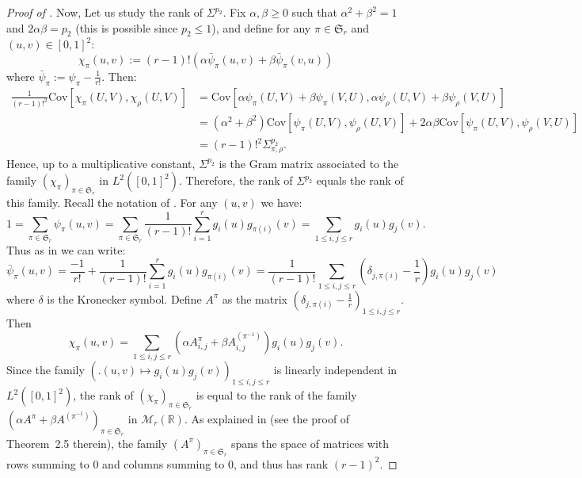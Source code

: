 \documentclass{article}
\theoremstyle{remark}
\def\R{\mathbb{R}}
\newcommand{\cov}[2]{\mathrm{Cov}\left[#1,#2\right]}
\def\S{\mathfrak{S}}
\def\carre{[0,1]^2}
\begin{document}
\begin{proof}[Proof of ]
    Now, Let us study the rank of $\Sigma^{p_2}$.
    Fix $\alpha,\beta \ge 0$ such that $\alpha^2+\beta^2=1$ and $2\alpha\beta=p_2$ (this is possible since $p_2\le 1$), and define for any $\pi\in\S_r$ and $(u,v)\in\carre$: 
    \begin{equation*}
        \chi_\pi(u,v) := (r-1)!\left(\alpha\bar\psi_\pi(u,v) + \beta\bar\psi_\pi(v,u)\right)
    \end{equation*}
    where $\bar\psi_\pi := \psi_\pi - \frac{1}{r!}$.
    Then:
    \begin{align*}
        \frac{1}{(r-1)!^2}\cov{\chi_\pi(U,V)}{\chi_\rho(U,V)}
        &= \cov{\alpha\psi_\pi(U,V) + \beta\psi_\pi(V,U)}{\alpha\psi_\rho(U,V) + \beta\psi_\rho(V,U)}
        \\&= (\alpha^2+\beta^2)\cov{\psi_\pi(U,V)}{\psi_\rho(U,V)}
        + 2\alpha\beta\cov{\psi_\pi(U,V)}{\psi_\rho(V,U)}
        \\&= (r-1)!^2\Sigma^{p_2}_{\pi,\rho} .
    \end{align*}
    Hence, up to a multiplicative constant, $\Sigma^{p_2}$ is the Gram matrix associated to the family $(\chi_\pi)_{\pi\in\S_r}$ in $L^2(\carre)$.
    Therefore, the rank of $\Sigma^{p_2}$ equals the rank of this family.
    Recall the notation of .
    For any $(u,v)$ we have:
    \begin{equation*}
        1 = \sum_{\pi\in\S_r} \psi_\pi(u,v)
        = \sum_{\pi\in\S_r}\frac{1}{(r-1)!}\sum_{i=1}^r g_i(u) g_{\pi(i)}(v)
        = \sum_{1\le i,j\le r} g_i(u) g_j(v) .
    \end{equation*}
    Thus as in \cite{JNZ15} we can write:
    \begin{equation*}
        \bar\psi_\pi(u,v)
        = \frac{-1}{r!} + \frac{1}{(r-1)!}\sum_{i=1}^r g_i(u) g_{\pi(i)}(v)
        = \frac{1}{(r-1)!}\sum_{1\le i,j\le r} \left(\delta_{j,\pi(i)}-\frac1r\right)g_i(u)g_j(v)
    \end{equation*}
    where $\delta$ is the Kronecker symbol.
    Define $A^\pi$ as the matrix $\left(\delta_{j,\pi(i)}-\frac1r\right)_{1\le i,j\le r}$.
    Then 
    \begin{equation*}
        \chi_\pi(u,v)
        = \sum_{1\le i,j\le r}\left( \alpha A^\pi_{i,j} + \beta A^{(\pi^{-1})}_{i,j} \right)g_i(u)g_j(v) .
    \end{equation*}
    Since the family $\left(\big.(u,v)\mapsto g_i(u)g_j(v)\right)_{1\le i,j\le r}$ is linearly independent in $L^2(\carre)$, the rank of $(\chi_\pi)_{\pi\in\S_r}$ is equal to the rank of the family $\left(\alpha A^\pi + \beta A^{(\pi^{-1})}\right)_{\pi\in\S_r}$ in $\mathcal{M}_r(\R)$.
    As explained in \cite{JNZ15} (see the proof of Theorem~2.5 therein), the family $(A^\pi)_{\pi\in\S_r}$ spans the space of matrices with rows summing to 0 and columns summing to 0, and thus has rank $(r-1)^2$.


\end{proof}
\end{document}
